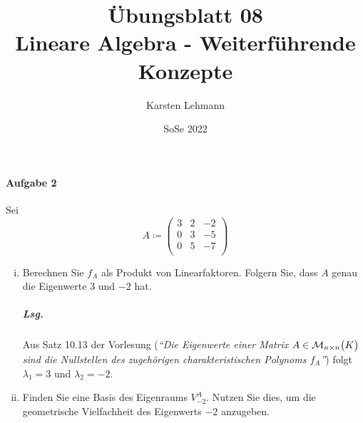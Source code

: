 \documentclass{scrreprt}
\author{Karsten Lehmann}
\date{SoSe 2022}
\title{Übungsblatt 08\\Lineare Algebra - Weiterführende Konzepte}
\begin{document}
\paragraph{Aufgabe 2} Sei
\[
  A \coloneqq \begin{pmatrix}
    3 & 2 & -2 \\
    0 & 3 & -5 \\
    0 & 5 & -7 \\
  \end{pmatrix}
\]
\begin{enumerate}[(i)]
\item Berechnen Sie $f_A$ als Produkt von Linearfaktoren.
  Folgern Sie, dass $A$ genau die Eigenwerte $3$ und $-2$ hat.

  \subparagraph{Lsg.}
  Aus Satz 10.13 der Vorlesung (\emph{``Die Eigenwerte einer Matrix
    $A \in \mathcal{M}_{n \times n}\qty\big(K)$ sind die Nullstellen des
    zugehörigen charakteristischen Polynoms $f_A$''}) folgt
  $\lambda_1 = 3$ und $\lambda_2 = -2$.

\item Finden Sie eine Basis des Eigenraums $V_{-2}^A$.
  Nutzen Sie dies, um die geometrische Vielfachheit des Eigenwerts $-2$
  anzugeben.


\end{enumerate}
\end{document}

